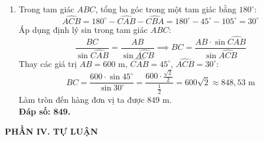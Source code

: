 \documentclass[12pt,a4paper]{article}
\begin{document}
\begin{enumerate}[resume]
\item Trong tam giác $ABC$, tổng ba góc trong một tam giác bằng $180^\circ$:
\[ \widehat{ACB} = 180^\circ - \widehat{CAB} - \widehat{CBA} = 180^\circ - 45^\circ - 105^\circ = 30^\circ \]
Áp dụng định lý sin trong tam giác $ABC$:
\[ \dfrac{BC}{\sin \widehat{CAB}} = \dfrac{AB}{\sin \widehat{ACB}} \implies BC = \dfrac{AB \cdot \sin \widehat{CAB}}{\sin \widehat{ACB}} \]
Thay các giá trị $AB = 600\text{ m}$, $\widehat{CAB} = 45^\circ$, $\widehat{ACB} = 30^\circ$:
\[ BC = \dfrac{600 \cdot \sin 45^\circ}{\sin 30^\circ} = \dfrac{600 \cdot \frac{\sqrt{2}}{2}}{\frac{1}{2}} = 600\sqrt{2} \approx 848{,}53\text{ m} \]
Làm tròn đến hàng đơn vị ta được $849\text{ m}$.\\
\textbf{Đáp số: 849.}
\end{enumerate}

\textbf{PHẦN IV. TỰ LUẬN}
\end{document}
